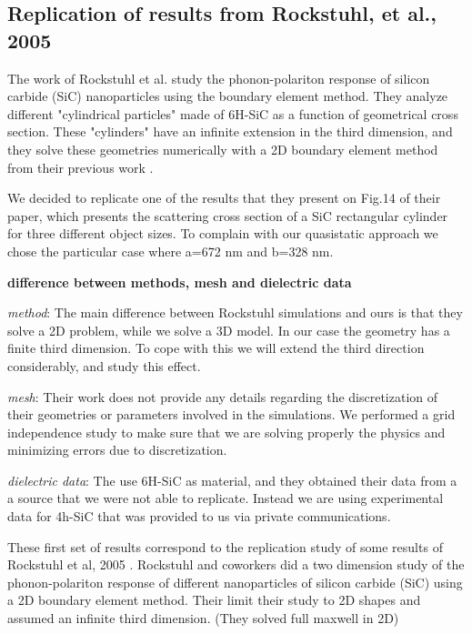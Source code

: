 
\subsection{Replication of results from Rockstuhl, et al., 2005}

The work of Rockstuhl et al. study the phonon-polariton response of silicon carbide (SiC)
nanoparticles using the boundary element method. They analyze different "cylindrical particles"
made of 6H-SiC as a function of geometrical cross section. These "cylinders" have an infinite
extension in the third dimension, and they solve these geometries numerically with a 2D 
boundary element method from their previous work \cite{rockstuhl2003}. 


We decided to replicate one of the results that they present on Fig.14 of their paper, which 
presents the scattering cross section of a SiC rectangular cylinder for three different object 
sizes. To complain with our quasistatic approach we chose the particular case where a=672 nm and 
b=328 nm.

\textbf{difference between methods, mesh and dielectric data}

\textit{method}: The main difference between Rockstuhl simulations and ours is that they solve a 2D problem, 
while we solve a 3D model. In our case the geometry has a finite third dimension. To cope with this
we will extend the third direction considerably, and study this effect. 

\textit{mesh}: Their work does not provide any details regarding the discretization of their geometries or 
parameters involved in the simulations. We performed a grid independence study to make sure that we are
solving properly the physics and minimizing errors due to discretization. 

\textit{dielectric data}: The use 6H-SiC as material, and they obtained their data from a a source that we
were not able to replicate. Instead we are using experimental data for 4h-SiC that was provided to us 
via private communications.  







These first set of results correspond to the replication study of some results 
of Rockstuhl et al, 2005 \cite{rockstuhl2005}. Rockstuhl and coworkers did a two dimension 
study of the phonon-polariton response of different nanoparticles of silicon carbide (SiC)
using a 2D boundary element method. Their limit their study to 2D shapes and assumed an infinite
third dimension. (They solved full maxwell in 2D)


